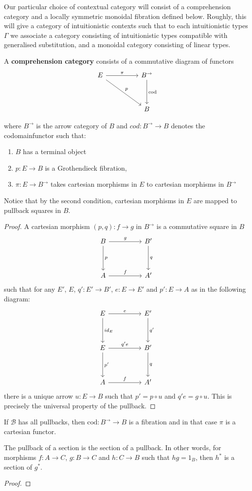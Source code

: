 Our particular choice of contextual category will consist of a comprehension category \cite{jacobs} and a locally symmetric monoidal fibration defined below. Roughly, this will give a category of intuitionistic contexts such that to each intuitionistic types $\Gamma$ we associate a category consisting of intuitionistic types compatible with generalised substitution, and a monoidal category consisting of linear types.
\begin{defn}
A \textbf{comprehension category} consists of a commutative diagram of functors
\[
\ti
E \ar[rd, "p"] \ar[r, "\pi"]  & B^{\to} \ar[d, "\text{cod}"]\\
& B
\kz
\]

where $B^\to$ is the arrow category of $B$ and $cod : B^\to \to B$ denotes the codomainfunctor such that:
\begin{enumerate}%
\item $B$ has a terminal object
\item $p : E\to B$ is a Grothendieck fibration,
\item $\pi : E\to B^\to$ takes cartesian morphisms in $E$ to cartesian morphisms in $B^\to$
\end{enumerate}
\begin{lem} Notice that by the second condition, cartesian morphisms in $E$ are mapped to pullback squares in $B$.
\begin{proof}
A cartesian morphism $(p, q) : f \to g$ in $B^\to$ is a commutative square in $B$
\[
\ti
B \ar[r, "g"] \ar[d, "p"] & B' \ar[d, "q"]\\
A \ar[r,"f"] & A'
\kz
\]
such that for any $E'$, $E$, $q' : E' \to B'$, $e : E \to E'$ and $p' : E \to A$ as in the following diagram:
\[
\ti
E \ar[d, "id_E"] \ar[r, "e"] & E' \ar[d, "q'"] \\
E \ar[d, "p'"] \ar[r, "q'e"] & B' \ar[d,"q"] \\
A \ar[r, "f"] & A'
\kz
\]
there is a unique arrow $u : E \to B$ such that $p' = p \circ u$ and $q'e = g \circ u$. This is precisely the universal property of the pullback.
\end{proof}
\end{lem}
If $\mathcal{B}$ has all pullbacks, then $\text{cod} : B^\to \to B$ is a fibration and in that case $\pi$ is a cartesian functor.
\begin{lem}\label{pb-lem}
The pullback of a section is the section of a pullback. In other words, for morphisms $f : A \to C$, $g : B \to C$ and $h : C \to B$ such that $hg = 1_B$, then $h^*$ is a section of $g^*$.
\begin{proof}

\end{proof}
\end{lem}
\end{defn}
